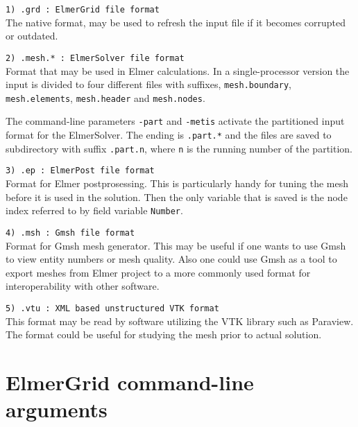 \begin{description}

\item \texttt{1)  .grd     : ElmerGrid file format} \\
The native format, may be used to refresh the input file if it becomes
corrupted or outdated.

\item \texttt{2)  .mesh.*   : ElmerSolver file format} \\
Format that may be used in Elmer calculations.
In a single-processor version 
the input is divided to four different files with 
suffixes, \texttt{mesh.boundary}, \texttt{mesh.elements},
\texttt{mesh.header} and \texttt{mesh.nodes}.

The command-line parameters \texttt{-part} and \texttt{-metis} 
activate the partitioned 
input format for the ElmerSolver. 
The ending is \texttt{.part.*} and the 
files are saved to 
subdirectory with suffix \texttt{.part.n}, where
\texttt{n} is the running number of the partition.

\item \texttt{3)  .ep       : ElmerPost file format} \\
Format for Elmer postprosessing. This is particularly handy for tuning the
mesh before it is used in the solution. Then the only variable that is saved is 
the node index referred to by field variable \texttt{Number}.

\item \texttt{4)  .msh      : Gmsh file format} \\
Format for Gmsh mesh generator. This may be useful if one wants to use Gmsh to view entity numbers or mesh quality. 
Also one could use Gmsh as a tool to export meshes from Elmer project to a more commonly used format for interoperability with other software.

\item \texttt{5)  .vtu      : XML based unstructured VTK format} \\
This format may be read by software utilizing the VTK library such as Paraview. 
The format could be useful for studying the mesh prior to actual solution.



\end{description}



\section{ElmerGrid command-line arguments}

